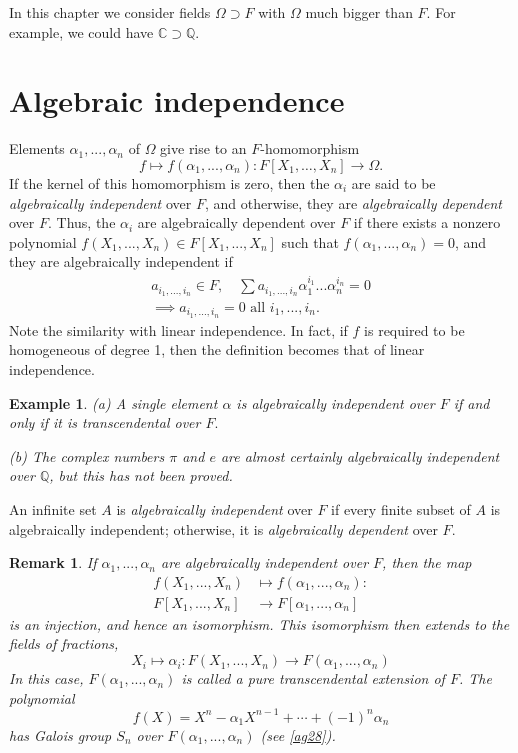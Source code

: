\documentclass[a4paper,11pt,final,openany]{memoir}
\newtheorem{example}[X]{Example}
\newtheorem{remark}[X]{Remark}
\theoremstyle{nonumberplain}
\begin{document}
In this chapter we consider fields $\Omega\supset F$ with $\Omega$ much bigger
than $F$. For example, we could have $\mathbb{C}\supset\mathbb{Q}.$

\section{Algebraic independence}

Elements $\alpha_{1},...,\alpha_{n}$ of $\Omega$ give rise to an
$F$-homomorphism%
\[
f\mapsto f(\alpha_{1},...,\alpha_{n})\colon F[X_{1},\ldots,X_{n}%
]\rightarrow\Omega\text{.}%
\]
If the kernel of this homomorphism is zero, then the $\alpha_{i}$ are said to
be \emph{algebraically independent\/}\label{ai}%
over $F$, and otherwise, they are \emph{algebraically dependent}%
%
\emph{ }over $F$. Thus, the $\alpha_{i}$ are algebraically dependent over $F$
if there exists a nonzero polynomial $f(X_{1},...,X_{n})\in F[X_{1}%
,...,X_{n}]$ such that $f(\alpha_{1},...,\alpha_{n})=0$, and they are
algebraically independent if
\begin{align*}
a_{i_{1},...,i_{n}}\in F,\quad\sum a_{i_{1},...,i_{n}}\alpha_{1}^{i_{1}%
}...\alpha_{n}^{i_{n}}=0\\
\implies a_{i_{1},...,i_{n}}=0\text{\ all }%
i_{1},...,i_{n}.
\end{align*}
Note the similarity with linear independence. In fact, if $f$ is required to
be homogeneous of degree 1, then the definition becomes that of linear independence.

\begin{example}
\label{te1}(a) A single element $\alpha$ is algebraically independent over $F$
if and only if it is transcendental over $F.$

(b) The complex numbers $\pi$ and $e$ are almost certainly algebraically
independent over $\mathbb{Q}$, but this has not been proved.
\end{example}

An infinite set $A$ is \emph{algebraically independent\/} over $F$ if every
finite subset of $A$ is algebraically independent; otherwise, it is
\emph{algebraically dependent} over $F$.

\begin{remark}
\label{te2}If $\alpha_{1},...,\alpha_{n}$ are algebraically independent over
$F$, then the map
\begin{align*}
f(X_{1},...,X_{n})&\mapsto f(\alpha_{1},...,\alpha_{n})\colon \\
F[X_{1}%
,...,X_{n}]&\rightarrow F[\alpha_{1},...,\alpha_{n}]
\end{align*}
is an injection, and hence an isomorphism. This isomorphism then extends to
the fields of fractions,
\[
X_{i}\mapsto\alpha_{i}\colon F(X_{1},...,X_{n})\rightarrow F(\alpha
_{1},...,\alpha_{n})
\]
In this case, $F(\alpha_{1},...,\alpha_{n})$ is called a \emph{pure
transcendental } \emph{extension\/} of $F$. The polynomial
\[
f(X)=X^{n}-\alpha_{1}X^{n-1}+\cdots+(-1)^{n}\alpha_{n}%
\]
has Galois group $S_{n}$ over $F(\alpha_{1},...,\alpha_{n})$ (see \ref{ag28}).
\end{remark}
\end{document}
